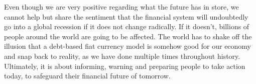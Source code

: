 Even though we are very positive regarding what the future has in store, we cannot help but share the sentiment that the financial system will undoubtedly go into a global recession if it does not change radically. If it doesn't, billions of people around the world are going to be affected. The world has to shake off the illusion that a debt-based fiat currency model is somehow good for our economy and snap back to reality, as we have done multiple times throughout history. Ultimately, it is about informing, warning and preparing people to take action today, to safeguard their financial future of tomorrow.